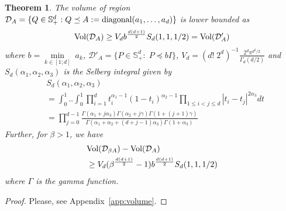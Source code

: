 \documentclass[Afour,sageh,times]{sagej}
\newtheorem{theorem}{\bf Theorem}
\begin{document}
\begin{theorem}
\label{theo:volume}
\normalfont The volume of region $\mathcal{D}_A=\{Q\in \mathbb{S}^d_{+}: Q \preceq A:=\textup{diagonal}(a_1, \dots, a_d)\}$ is lower bounded as
\begin{align}
\label{eq:vol_DA}
    \textup{Vol}(\mathcal{D}_A) \geq V_db^{\frac{d(d+1)}{2}}S_d(1,1,1/2)=\textup{Vol}(\mathcal{D}'_A)
\end{align}
where $b=\underset{k\in[1;d]}{\min}\;a_k$, $\mathcal{D}'_{A}=\{P\in\mathbb{S}^d_+:\;P\preceq b I \}$, $V_d = (d! \; 2^d)^{-1} \frac{2^d \pi^{d^2/2}}{\Gamma_d(d/2)} $ and $S_d(\alpha_1,\alpha_2,\alpha_3)$ is the Selberg integral given by
\begin{align}
     &S_d(\alpha_1, \alpha_2, \alpha_3)\nonumber\\
     &=\int_0^1 .. \int_0^1 \prod_{i=1}^d t_i^{\alpha_1-1}\left(1-t_i\right)^{\alpha_2-1} \prod_{1 \leq i<j \leq d}\left|t_i-t_j\right|^{2 \alpha_3} d t \nonumber \\ 
     & =\prod_{j=0}^{d-1} \frac{\Gamma(\alpha_1+j \alpha_3) \Gamma(\alpha_2+j \gamma) \Gamma(1+(j+1) \gamma)}{\Gamma(\alpha_1+\alpha_2+(d+j-1) \alpha_3) \Gamma(1+\alpha_3)}\nonumber
\end{align}
Further, for $\beta>1$, we have
\begin{align}
    &\textup{Vol}(\mathcal{D}_{\beta A})-\textup{Vol}(\mathcal{D}_{ A})\nonumber\\
    &\geq V_d (\beta^{\frac{d(d+1)}{2}}-1) b^{\frac{d(d+1)}{2}}S_d(1,1,1/2)
\end{align}
where
$\Gamma$ is the gamma function.
\end{theorem}
\begin{proof}
Please, see Appendix~\ref{app:volume}.
\end{proof}
\end{document}
